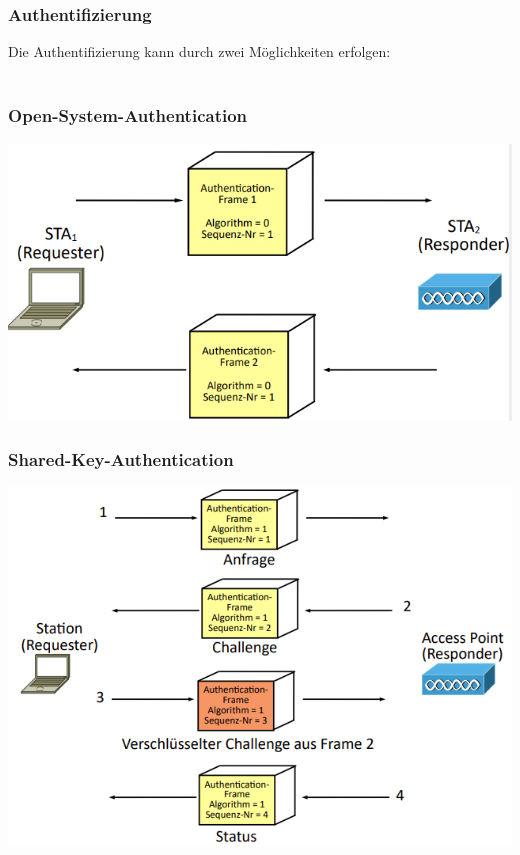 \documentclass[12pt,a4paper]{article}
\begin{document}
		\subsubsection{Authentifizierung}
			Die Authentifizierung kann durch zwei Möglichkeiten erfolgen:\\\\
			\begin{minipage}[t]{.45\textwidth}
				\subsubsection*{Open-System-Authentication}
				\includegraphics[width=\textwidth]{Bilder/os_auth.PNG}
			\end{minipage}
			\hspace{0.1\textwidth}
			\begin{minipage}[t]{.45\textwidth}
				\subsubsection*{Shared-Key-Authentication}
				\includegraphics[width=\textwidth]{Bilder/sk_auth.PNG}
			\end{minipage}
\end{document}
